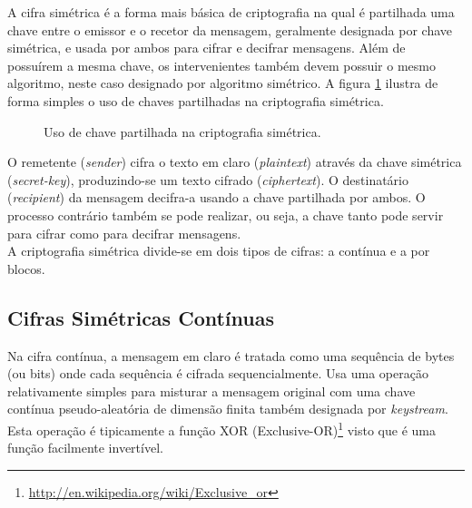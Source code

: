 \documentclass[a4paper,11pt,openright,oneside]{report}
\begin{document}
A cifra simétrica é a forma mais básica de criptografia na qual é partilhada uma chave entre o emissor e o recetor da mensagem, geralmente designada por chave simétrica, e usada por ambos para cifrar e decifrar mensagens. Além de possuírem a mesma chave, os intervenientes também devem possuir o mesmo algoritmo, neste caso designado por algoritmo simétrico. A figura \ref{fig:crypto1} ilustra de forma simples o uso de chaves partilhadas na criptografia simétrica.

\begin{figure}[ht]
\center
{}
\caption{Uso de chave partilhada na criptografia simétrica.}
\label{fig:crypto1}
\end{figure}

O remetente (\textit{sender}) cifra o texto em claro (\textit{plaintext}) através da chave simétrica (\textit{secret-key}), produzindo-se um texto cifrado (\textit{ciphertext}). O destinatário (\textit{recipient}) da mensagem decifra-a usando a chave partilhada por ambos. O processo contrário também se pode realizar, ou seja, a chave tanto pode servir para cifrar como para decifrar mensagens.\\

A criptografia simétrica divide-se em dois tipos de cifras: a contínua e a por blocos.

\subsection{Cifras Simétricas Contínuas}

Na cifra contínua, a mensagem em claro é tratada como uma sequência de bytes (ou bits) onde cada sequência é cifrada sequencialmente. Usa uma operação relativamente simples para misturar a mensagem original com uma chave contínua pseudo-aleatória de dimensão finita também designada por \textit{keystream}. Esta operação é tipicamente a função XOR (Exclusive-OR)\footnote{\url{http://en.wikipedia.org/wiki/Exclusive_or}} visto que é uma função facilmente invertível.\\
\end{document}

